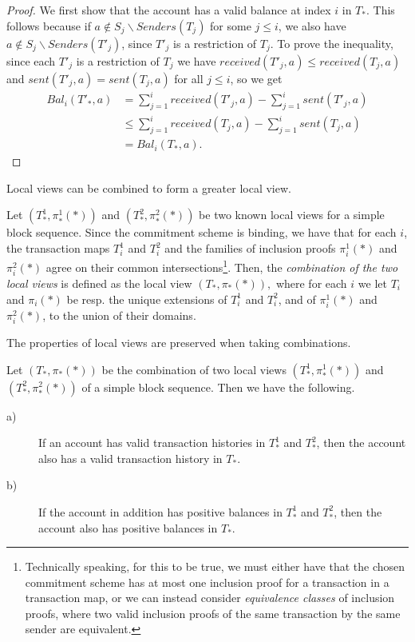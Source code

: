\begin{proof}
  We first show that the account has a valid balance at index \(i\) in \(T_*\). This follows because if \(a \notin S_j \backslash Senders(T_j)\) for some \(j \leq i\), we also have \(a \notin S_j \backslash Senders(T'_j)\), since \(T'_j\) is a restriction of \(T_j\). To prove the inequality, since each \(T'_j\) is a restriction of \(T_j\) we have \(received(T'_j,a) \leq received(T_j,a)\) and \(sent(T'_j,a) = sent(T_j,a)\) for all \(j \leq i\), so we get
  \begin{align*}
      Bal_i(T'_*,a) &= \sum_{j=1}^i received(T'_j,a) - \sum_{j=1}^i sent(T'_j,a) \\
      &\leq \sum_{j=1}^i received(T_j,a) - \sum_{j=1}^i sent(T_j,a) \\
      &= Bal_i(T_*,a).
  \end{align*}
\end{proof}

Local views can be combined to form a greater local view.

\begin{defn}
  Let \((T^1_*, \pi^1_*(*))\) and \((T^2_*, \pi^2_*(*))\) be two known local views for a simple block sequence. Since the commitment scheme is binding, we have that for each \(i\), the transaction maps \(T^1_i\) and \(T^2_i\) and the families of inclusion proofs \(\pi^1_i(*)\) and \(\pi^2_i(*)\) agree on their common intersections\footnote{Technically speaking, for this to be true, we must either have that the chosen commitment scheme has at most one inclusion proof for a transaction in a transaction map, or we can instead consider \emph{equivalence classes} of inclusion proofs, where two valid inclusion proofs of the same transaction by the same sender are equivalent.}. Then, the \emph{combination of the two local views} is defined as the local view \((T_*, \pi_*(*)),\) where for each \(i\) we let \(T_i\) and \(\pi_i(*)\) be resp. the unique extensions of \(T^1_i\) and \(T^2_i\), and of \(\pi^1_i(*)\) and \(\pi^2_i(*)\), to the union of their domains.
\end{defn}

The properties of local views are preserved when taking combinations.

\begin{prop}\label{theorem:joining-transaction-maps}
  Let \((T_*, \pi_*(*))\) be the combination of two local views \((T^1_*, \pi^1_*(*))\) and \((T^2_*, \pi^2_*(*))\) of a simple block sequence. Then we have the following.
  
  \begin{description}
      \item[a)] If an account has valid transaction histories in \(T^1_*\) and \(T^2_*\), then the account also has a valid transaction history in \(T_*\).
      \item[b)] If the account in addition has positive balances in \(T^1_*\) and \(T^2_*\), then the account also has positive balances in \(T_*\).
  \end{description}
\end{prop}

